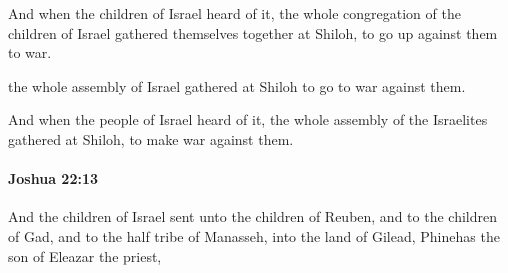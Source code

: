			\begin{versebox}
					\item[BHS] 
					\item[ASV] And when the children of Israel heard of it, the whole congregation of the children of Israel gathered themselves together at Shiloh, to go up against them to war.
					\item[NIV] the whole assembly of Israel gathered at Shiloh to go to war against them.
					\item[NRSV] And when the people of Israel heard of it, the whole assembly of the Israelites gathered at Shiloh, to make war against them.
			\end{versebox}

		\paragraph{Joshua 22:13} %
			\label{JOSHUA-22-13}

			And the children of Israel sent unto the children of Reuben, and to the children of Gad, and to the half tribe of Manasseh, into the land of Gilead, Phinehas the son of Eleazar the priest,


